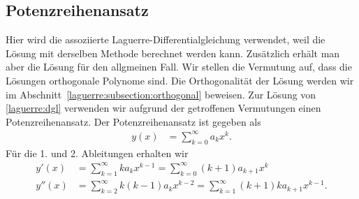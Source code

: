\subsection{Potenzreihenansatz%
\label{laguerre:subsection:potenzreihenansatz}}
Hier wird die assoziierte Laguerre-Differentialgleichung verwendet,
weil die Lösung mit derselben Methode berechnet werden kann.
Zusätzlich erhält man aber die Lösung für den allgmeinen Fall.
Wir stellen die Vermutung auf,
dass die Lösungen orthogonale Polynome sind.
Die Orthogonalität der Lösung werden wir im
%
Abschnitt~\ref{laguerre:subsection:orthogonal} beweisen.
Zur Lösung von \eqref{laguerre:dgl} verwenden wir aufgrund
der getroffenen Vermutungen einen Potenzreihenansatz.
Der Potenzreihenansatz ist gegeben als
%
\begin{align*}
y(x)
 & =
\sum_{k=0}^\infty a_k x^k
.
\end{align*}
Für die 1. und 2. Ableitungen erhalten wir
\begin{align*}
y'(x)
 & =
\sum_{k=1}^\infty k a_k x^{k-1}
=
\sum_{k=0}^\infty (k+1) a_{k+1} x^k
\\
y''(x)
 & =
\sum_{k=2}^\infty k (k-1) a_k x^{k-2}
=
\sum_{k=1}^\infty (k+1) k a_{k+1} x^{k-1}
.
\end{align*}

